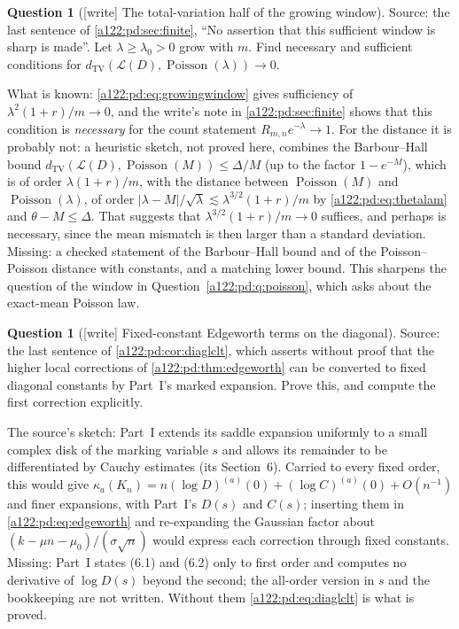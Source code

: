 \documentclass[11pt,letterpaper]{article}
\numberwithin{equation}{subsection}
\theoremstyle{definition}
\newtheorem{question}[theorem]{Question}
\theoremstyle{remark}
\theoremstyle{plain}
\newcommand{\Poi}{\operatorname{Poisson}}
\newcommand{\TV}{d_{\mathrm{TV}}}
\begin{document}
\begin{question}[{[write]} The total-variation half of the growing window]\label{a122:pd:q:twindow}
Source: the last sentence of \cref{a122:pd:sec:finite}, ``No assertion
that this sufficient window is sharp is made''. Let $\lambda\ge\lambda_0>0$
grow with $m$. Find necessary and sufficient conditions for
$\TV(\mathcal L(D),\Poi(\lambda))\to0$.
\end{question}
What is known: \eqref{a122:pd:eq:growingwindow} gives sufficiency of
$\lambda^2(1+r)/m\to0$, and the write's note in
\cref{a122:pd:sec:finite} shows that this condition is \emph{necessary}
for the count statement $R_{m,n}e^{-\lambda}\to1$. For the distance it is
probably not: a heuristic sketch, not proved here, combines the
Barbour--Hall bound \cite{a122:pd:barbourhall}
$\TV(\mathcal L(D),\Poi(M))\le\Delta/M$ (up to the
factor $1-e^{-M}$), which is of order $\lambda(1+r)/m$, with the distance
between $\Poi(M)$ and $\Poi(\lambda)$, of order
$|\lambda-M|/\sqrt\lambda\lesssim\lambda^{3/2}(1+r)/m$ by
\eqref{a122:pd:eq:thetalam} and $\theta-M\le\Delta$. That suggests that
$\lambda^{3/2}(1+r)/m\to0$ suffices, and perhaps is necessary, since the
mean mismatch is then larger than a standard deviation. Missing: a
checked statement of the Barbour--Hall bound and of the Poisson--Poisson
distance with constants, and a matching lower bound. This sharpens the
question of the window in Question~\ref{a122:pd:q:poisson}, which asks
about the exact-mean Poisson law.

\begin{question}[{[write]} Fixed-constant Edgeworth terms on the diagonal]\label{a122:pd:q:diagedge}
Source: the last sentence of \cref{a122:pd:cor:diaglclt}, which asserts
without proof that the higher local corrections of
\cref{a122:pd:thm:edgeworth} can be converted to fixed diagonal constants
by Part~I's marked expansion. Prove this, and compute the first
correction explicitly.
\end{question}
The source's sketch: Part~I extends its saddle expansion uniformly to a
small complex disk of the marking variable $s$ and allows its remainder
to be differentiated by Cauchy estimates (its Section~6). Carried to every
fixed order, this would give
$\kappa_a(K_n)=n(\log D)^{(a)}(0)+(\log C)^{(a)}(0)+O(n^{-1})$ and finer
expansions, with Part~I's $D(s)$ and $C(s)$; inserting them in
\eqref{a122:pd:eq:edgeworth} and re-expanding the Gaussian factor about
$(k-\mu n-\mu_0)/(\sigma\sqrt n)$ would express each correction through
fixed constants. Missing: Part~I states (6.1) and (6.2) only to first
order and computes no derivative of $\log D(s)$ beyond the second; the
all-order version in $s$ and the bookkeeping are not written. Without
them \eqref{a122:pd:eq:diaglclt} is what is proved.
\end{document}
